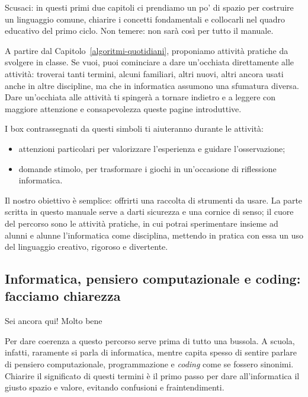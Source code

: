Scusaci: in questi primi due capitoli ci prendiamo un po' di spazio per costruire un linguaggio comune, chiarire i concetti fondamentali e collocarli nel quadro educativo del primo ciclo. Non temere: non sarà così per tutto il manuale.

A partire dal Capitolo~\ref{algoritmi-quotidiani}, proponiamo attività pratiche da svolgere in classe. Se vuoi, puoi cominciare a dare un'occhiata direttamente alle attività: troverai tanti termini, alcuni familiari, altri nuovi, altri ancora usati anche in altre discipline, ma che in informatica assumono una sfumatura diversa. Dare un'occhiata alle attività ti spingerà a tornare indietro e a leggere con maggiore attenzione e consapevolezza queste pagine introduttive.

I box contrassegnati da questi simboli ti aiuteranno durante le attività:

\begin{itemize}
\item[\guideiconAttention{}]
  attenzioni particolari per valorizzare l'esperienza e guidare l'osservazione;
\item[\guideiconQuestion{}]
  domande stimolo, per trasformare i giochi in un'occasione di riflessione informatica.
\end{itemize}

Il nostro obiettivo è semplice: offrirti una raccolta di strumenti da usare. La parte scritta in questo manuale serve a darti sicurezza e una cornice di senso; il cuore del percorso sono le attività pratiche, in cui potrai sperimentare insieme ad alunni e alunne l'informatica come disciplina, mettendo in pratica con essa un uso del linguaggio creativo, rigoroso e divertente.

\subsection{Informatica, pensiero computazionale e coding: facciamo chiarezza }\label{informatica-pensiero-computazionale-e-coding-facciamo-chiarezza}

Sei ancora qui! Molto bene 

Per dare coerenza a questo percorso serve prima di tutto una bussola. A scuola, infatti, raramente si parla di informatica, mentre capita spesso di sentire parlare di pensiero computazionale, programmazione e \textit{coding} come se fossero sinonimi. Chiarire il significato di questi termini è il primo passo per dare all'informatica il giusto spazio e valore, evitando confusioni e fraintendimenti.

